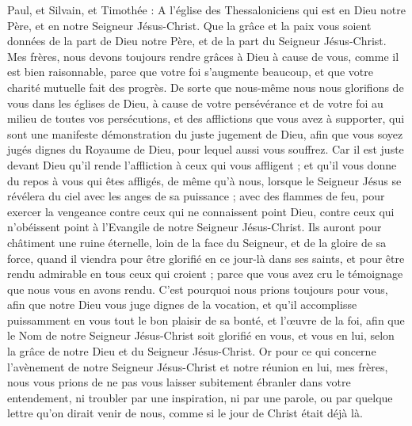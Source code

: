 \begin{multicols}{2}
\VerseOne{}Paul, et Silvain, et Timothée : A l'église des Thessaloniciens qui est en Dieu notre Père, et en notre Seigneur Jésus-Christ.
Que la grâce et la paix vous soient données de la part de Dieu notre Père, et de la part du Seigneur Jésus-Christ.
Mes frères, nous devons toujours rendre grâces à Dieu à cause de vous, comme il est bien raisonnable, parce que votre foi s'augmente beaucoup, et que votre charité mutuelle fait des progrès.
De sorte que nous-même nous nous glorifions de vous dans les églises de Dieu, à cause de votre persévérance et de votre foi au milieu de toutes vos persécutions, et des afflictions que vous avez à supporter,
qui sont une manifeste démonstration du juste jugement de Dieu, afin que vous soyez jugés dignes du Royaume de Dieu, pour lequel aussi vous souffrez.
Car il est juste devant Dieu qu'il rende l'affliction à ceux qui vous affligent ;
et qu'il vous donne du repos à vous qui êtes affligés, de même qu'à nous, lorsque le Seigneur Jésus se révélera du ciel avec les anges de sa puissance ;
avec des flammes de feu, pour exercer la vengeance contre ceux qui ne connaissent point Dieu, contre ceux qui n'obéissent point à l'Evangile de notre Seigneur Jésus-Christ.
Ils auront pour châtiment une ruine éternelle, loin de la face du Seigneur, et de la gloire de sa force,
quand il viendra pour être glorifié en ce jour-là dans ses saints, et pour être rendu admirable en tous ceux qui croient ; parce que vous avez cru le témoignage que nous vous en avons rendu.
C'est pourquoi nous prions toujours pour vous, afin que notre Dieu vous juge dignes de la vocation, et qu'il accomplisse puissamment en vous tout le bon plaisir de sa bonté, et l'œuvre de la foi,
afin que le Nom de notre Seigneur Jésus-Christ soit glorifié en vous, et vous en lui, selon la grâce de notre Dieu et du Seigneur Jésus-Christ.
\VerseOne{}Or pour ce qui concerne l'avènement de notre Seigneur Jésus-Christ et notre réunion en lui, mes frères, nous vous prions
de ne pas vous laisser subitement ébranler dans votre entendement, ni troubler par une inspiration, ni par une parole, ou par quelque lettre qu'on dirait venir de nous, comme si le jour de Christ était déjà là.

\end{multicols}
